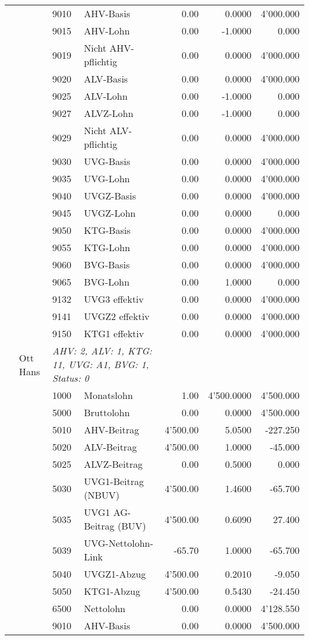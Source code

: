 \documentclass[15pt,a4paper]{article}
\begin{document}
\begin{longtable}{@{\extracolsep{\fill}}l l l l|r|r|r}
&&9010&AHV-Basis&0.00&0.0000&4'000.000\\
&&9015&AHV-Lohn&0.00&-1.0000&0.000\\
&&9019&Nicht AHV-pflichtig&0.00&0.0000&4'000.000\\
&&9020&ALV-Basis&0.00&0.0000&4'000.000\\
&&9025&ALV-Lohn&0.00&-1.0000&0.000\\
&&9027&ALVZ-Lohn&0.00&-1.0000&0.000\\
&&9029&Nicht ALV-pflichtig&0.00&0.0000&4'000.000\\
&&9030&UVG-Basis&0.00&0.0000&4'000.000\\
&&9035&UVG-Lohn&0.00&0.0000&4'000.000\\
&&9040&UVGZ-Basis&0.00&0.0000&4'000.000\\
&&9045&UVGZ-Lohn&0.00&0.0000&0.000\\
&&9050&KTG-Basis&0.00&0.0000&4'000.000\\
&&9055&KTG-Lohn&0.00&0.0000&4'000.000\\
&&9060&BVG-Basis&0.00&0.0000&4'000.000\\
&&9065&BVG-Lohn&0.00&1.0000&0.000\\
&&9132&UVG3 effektiv&0.00&0.0000&4'000.000\\
&&9141&UVGZ2 effektiv&0.00&0.0000&4'000.000\\
&&9150&KTG1 effektiv&0.00&0.0000&4'000.000\\
\pagebreak
19&Ott Hans&\multicolumn{2}{l|}{\small\emph{AHV: 2, ALV: 1, KTG: 11, UVG: A1, BVG: 1, Status: 0}}&& \\
&&1000&Monatslohn&1.00&4'500.0000&4'500.000\\
&&5000&Bruttolohn&0.00&0.0000&4'500.000\\
&&5010&AHV-Beitrag&4'500.00&5.0500&-227.250\\
&&5020&ALV-Beitrag&4'500.00&1.0000&-45.000\\
&&5025&ALVZ-Beitrag&0.00&0.5000&0.000\\
&&5030&UVG1-Beitrag (NBUV)&4'500.00&1.4600&-65.700\\
&&5035&UVG1 AG-Beitrag (BUV)&4'500.00&0.6090&27.400\\
&&5039&UVG-Nettolohn-Link&-65.70&1.0000&-65.700\\
&&5040&UVGZ1-Abzug&4'500.00&0.2010&-9.050\\
&&5050&KTG1-Abzug&4'500.00&0.5430&-24.450\\
&&6500&Nettolohn&0.00&0.0000&4'128.550\\
&&9010&AHV-Basis&0.00&0.0000&4'500.000\\

\end{longtable}
\end{document}
